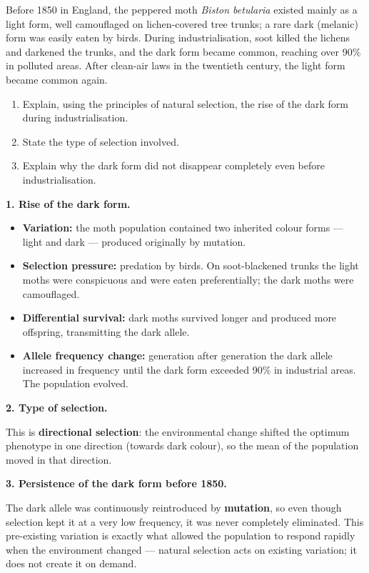 \documentclass[11pt]{article}
\begin{document}
\begin{exoresolu}
Before 1850 in England, the peppered moth \emph{Biston betularia} existed mainly as a light form, well camouflaged on lichen-covered tree trunks; a rare dark (melanic) form was easily eaten by birds. During industrialisation, soot killed the lichens and darkened the trunks, and the dark form became common, reaching over 90\% in polluted areas. After clean-air laws in the twentieth century, the light form became common again.
\begin{enumerate}
\item Explain, using the principles of natural selection, the rise of the dark form during industrialisation.
\item State the type of selection involved.
\item Explain why the dark form did not disappear completely even before industrialisation.
\end{enumerate}
\tcblower
\textbf{1. Rise of the dark form.}

\begin{itemize}
\item \textbf{Variation:} the moth population contained two inherited colour forms — light and dark — produced originally by mutation.
\item \textbf{Selection pressure:} predation by birds. On soot-blackened trunks the light moths were conspicuous and were eaten preferentially; the dark moths were camouflaged.
\item \textbf{Differential survival:} dark moths survived longer and produced more offspring, transmitting the dark allele.
\item \textbf{Allele frequency change:} generation after generation the dark allele increased in frequency until the dark form exceeded 90\% in industrial areas. The population evolved.
\end{itemize}

\textbf{2. Type of selection.}

This is \textbf{directional selection}: the environmental change shifted the optimum phenotype in one direction (towards dark colour), so the mean of the population moved in that direction.

\textbf{3. Persistence of the dark form before 1850.}

The dark allele was continuously reintroduced by \textbf{mutation}, so even though selection kept it at a very low frequency, it was never completely eliminated. This pre-existing variation is exactly what allowed the population to respond rapidly when the environment changed — natural selection acts on existing variation; it does not create it on demand.
\end{exoresolu}
\end{document}
